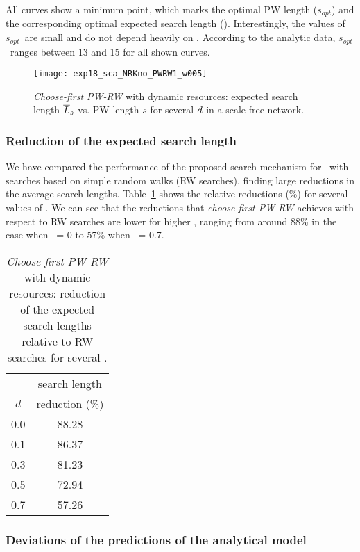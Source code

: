 \documentclass[]{elsarticle}
\newcommand{\s}		{\ensuremath{s}}		\newcommand{\sopt}	{\ensuremath{s_{opt}}}		\newcommand{\p}		{\ensuremath{p}}		\newcommand{\W}		{\ensuremath{W}}		\newcommand{\w}		{\ensuremath{w}}		\newcommand{\lsave}	{\ensuremath{\overline{l}_s}}	\newcommand{\lave}	{\ensuremath{\overline{l}}}	\newcommand{\lopt}	{\ensuremath{\overline{l}_{opt}}}
\begin{document}
All curves show a minimum point, which marks the optimal PW length (\sopt) and the corresponding optimal expected search length (\Lexpopt). Interestingly, the values of \sopt\ are small and do not depend heavily on \pd. According to the analytic data, \sopt\ ranges between 13 and 15 for all shown curves. \\

\begin{figure}
 \centering
 \texttt{[image: exp18\_sca\_NRKno\_PWRW1\_w005]}
 \caption{\emph{Choose-first PW-RW} with dynamic resources: expected search length $\overline{L}_s$ vs. PW length $\s$ for several $d$ in a scale-free network.}
 \label{fig:scalefree_pw1}
\end{figure}


\subsubsection{Reduction of the expected search length}

We have compared the performance of the proposed search mechanism for \Lexpopt\ with searches based on simple random walks (RW searches), finding large reductions in the average search lengths. Table~\ref{tab:H_reduction_RW_PWRW} shows the relative reductions (\%) for several values of \pd.  We can see that the reductions that \emph{choose-first PW-RW} achieves with respect to RW searches are lower for higher \pd, ranging from around 88\% in the case when \pd\ = 0 to 57\% when \pd\ = 0.7.


\begin{table}
\centering
\begin{tabular}{|c|c|}
\hline
\rule{0pt}{11pt}   & search length \\ 
              $d$  & reduction (\%)\\ \hline
              0.0  &  88.28 \\
              0.1  &  86.37 \\
              0.3  &  81.23 \\
              0.5  &  72.94 \\
              0.7  &  57.26 \\
\hline
\end{tabular}
\caption{\emph{Choose-first PW-RW} with dynamic resources: reduction of the expected search lengths relative to RW searches for several \pd.}
\label{tab:H_reduction_RW_PWRW}
\end{table}


\subsubsection{Deviations of the predictions of the analytical model}
\label{sssec:deviations}
\end{document}
